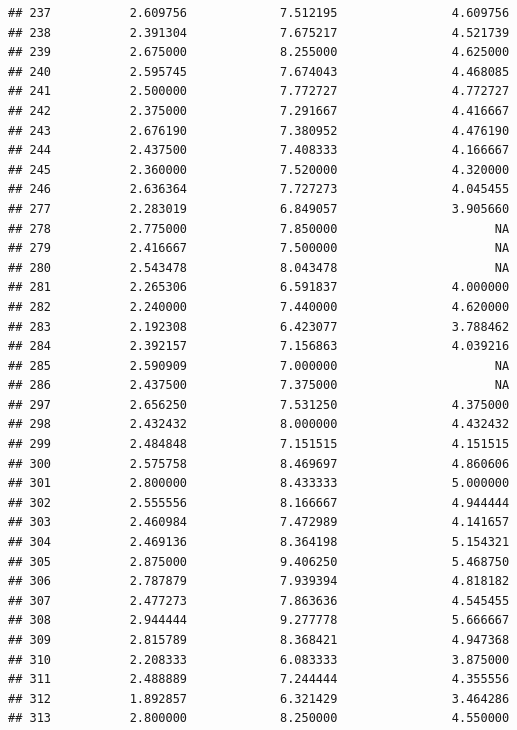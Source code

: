 \documentclass[]{article}
\begin{document}
\begin{verbatim}
## 237           2.609756             7.512195                4.609756
## 238           2.391304             7.675217                4.521739
## 239           2.675000             8.255000                4.625000
## 240           2.595745             7.674043                4.468085
## 241           2.500000             7.772727                4.772727
## 242           2.375000             7.291667                4.416667
## 243           2.676190             7.380952                4.476190
## 244           2.437500             7.408333                4.166667
## 245           2.360000             7.520000                4.320000
## 246           2.636364             7.727273                4.045455
## 277           2.283019             6.849057                3.905660
## 278           2.775000             7.850000                      NA
## 279           2.416667             7.500000                      NA
## 280           2.543478             8.043478                      NA
## 281           2.265306             6.591837                4.000000
## 282           2.240000             7.440000                4.620000
## 283           2.192308             6.423077                3.788462
## 284           2.392157             7.156863                4.039216
## 285           2.590909             7.000000                      NA
## 286           2.437500             7.375000                      NA
## 297           2.656250             7.531250                4.375000
## 298           2.432432             8.000000                4.432432
## 299           2.484848             7.151515                4.151515
## 300           2.575758             8.469697                4.860606
## 301           2.800000             8.433333                5.000000
## 302           2.555556             8.166667                4.944444
## 303           2.460984             7.472989                4.141657
## 304           2.469136             8.364198                5.154321
## 305           2.875000             9.406250                5.468750
## 306           2.787879             7.939394                4.818182
## 307           2.477273             7.863636                4.545455
## 308           2.944444             9.277778                5.666667
## 309           2.815789             8.368421                4.947368
## 310           2.208333             6.083333                3.875000
## 311           2.488889             7.244444                4.355556
## 312           1.892857             6.321429                3.464286
## 313           2.800000             8.250000                4.550000

\end{verbatim}
\end{document}
